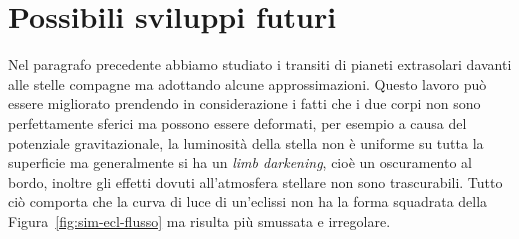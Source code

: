 \section{Possibili sviluppi futuri}
\label{sec:sviluppi-futuri}

Nel paragrafo precedente abbiamo studiato i transiti di pianeti extrasolari
davanti alle stelle compagne ma adottando alcune approssimazioni. Questo lavoro
può essere migliorato prendendo in considerazione i fatti che i due corpi non
sono perfettamente sferici ma possono essere deformati, per esempio a causa del
potenziale gravitazionale, la luminosità della stella non è uniforme su tutta la
superficie ma generalmente si ha un \emph{limb darkening}, cioè un oscuramento
al bordo, inoltre gli effetti dovuti all'atmosfera stellare non sono
trascurabili. Tutto ciò comporta che la curva di luce di un'eclissi non ha la
forma squadrata della Figura~\ref{fig:sim-ecl-flusso} ma risulta più smussata e
irregolare.

